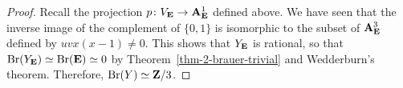 \begin{proof}
    Recall the projection $p \: V_{\bbE} \to \bbA_{\bbE}^1$ defined above.
    We have seen that the inverse image of the complement of $\{0,1\}$ is isomorphic
    to the subset of $\bbA_{\bbE}^3$ defined by $uvx(x-1) \neq 0$.
    This shows that $Y_{\bbE}$ is rational, so that
    $\Br (Y_{\bbE}) \simeq \Br (\bbE) \simeq 0$ 
    by Theorem~\ref{thm-2-brauer-trivial} and Wedderburn's theorem.
    Therefore, $\Br (Y) \simeq \bbZ/3$.
\end{proof}


